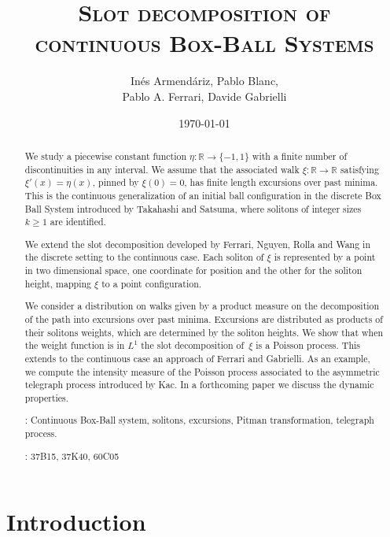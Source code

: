 \documentclass[12pt]{article}
\title{\textsc{Slot decomposition of\\ continuous Box-Ball Systems}}
\date{\today}
\author{Inés Armendáriz, Pablo Blanc, \\
 Pablo A. Ferrari, Davide Gabrielli}
\numberwithin{equation}{section}
\newcommand{\RR}{\mathbb R}
\begin{document}
	

	
	
\maketitle
	
\begin{abstract}
 \normalsize
We study a piecewise constant function $\eta:\RR\to\{-1,1\}$ with a finite number of discontinuities in any interval. We assume that the associated walk $\xi:\RR\to\RR$ satisfying $\xi'(x)=\eta(x)$, pinned by $\xi(0)=0$, has finite length excursions over past minima. This is the continuous generalization of an initial ball configuration in the discrete Box Ball System introduced by Takahashi and Satsuma, where solitons of integer sizes $k\ge1$ are identified. 

We extend the slot decomposition developed by Ferrari, Nguyen, Rolla and Wang in the discrete setting to the continuous case. Each soliton of $\xi$ is represented by a point in two dimensional space, one coordinate for position and the other for the soliton height, mapping $\xi$ to a point configuration. 

We consider a distribution on walks given by a product measure on the decomposition of the path into excursions over past minima. Excursions are distributed as products of their solitons weights, which are determined by the soliton heights. We show that when the weight function is in $L^1$ the slot decomposition of~$\xi$ is a Poisson process. This extends to the continuous case an approach of Ferrari and Gabrielli. As an example, we compute the intensity measure of the Poisson process associated to the asymmetric telegraph process introduced by Kac. In a forthcoming paper we discuss the dynamic properties. 

 
		
		
\bigskip
		
: Continuous Box-Ball system, solitons, excursions, Pitman transformation, telegraph process.
		

\smallskip
		

: 37B15, 37K40, 60C05

\end{abstract}

\tableofcontents
\section{Introduction}\label{s1}
\end{document}
